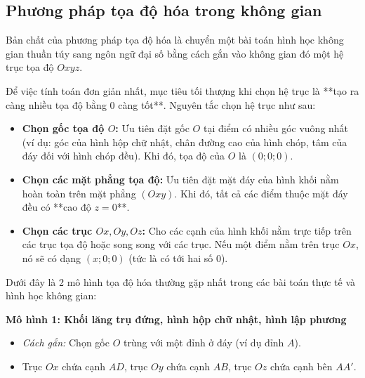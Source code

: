 \documentclass[12pt]{article}
\begin{document}
	\subsection{Phương pháp tọa độ hóa trong không gian}
	
	Bản chất của phương pháp tọa độ hóa là chuyển một bài toán hình học không gian thuần túy sang ngôn ngữ đại số bằng cách gắn vào không gian đó một hệ trục tọa độ $Oxyz$. 
	
	Để việc tính toán đơn giản nhất, mục tiêu tối thượng khi chọn hệ trục là **tạo ra càng nhiều tọa độ bằng 0 càng tốt**. Nguyên tắc chọn hệ trục như sau:
	
	\begin{itemize}
		\item \textbf{Chọn gốc tọa độ $O$:} Ưu tiên đặt gốc $O$ tại điểm có nhiều góc vuông nhất (ví dụ: góc của hình hộp chữ nhật, chân đường cao của hình chóp, tâm của đáy đối với hình chóp đều). Khi đó, tọa độ của $O$ là $(0; 0; 0)$.
		\item \textbf{Chọn các mặt phẳng tọa độ:} Ưu tiên đặt mặt đáy của hình khối nằm hoàn toàn trên mặt phẳng $(Oxy)$. Khi đó, tất cả các điểm thuộc mặt đáy đều có **cao độ $z = 0$**.
		\item \textbf{Chọn các trục $Ox, Oy, Oz$:} Cho các cạnh của hình khối nằm trực tiếp trên các trục tọa độ hoặc song song với các trục. Nếu một điểm nằm trên trục $Ox$, nó sẽ có dạng $(x; 0; 0)$ (tức là có tới hai số $0$).
	\end{itemize}
	
	Dưới đây là 2 mô hình tọa độ hóa thường gặp nhất trong các bài toán thực tế và hình học không gian:
	
	\textbf{Mô hình 1: Khối lăng trụ đứng, hình hộp chữ nhật, hình lập phương}
	\begin{itemize}
		\item \textit{Cách gắn:} Chọn gốc $O$ trùng với một đỉnh ở đáy (ví dụ đỉnh $A$).
		\item Trục $Ox$ chứa cạnh $AD$, trục $Oy$ chứa cạnh $AB$, trục $Oz$ chứa cạnh bên $AA'$.
	\end{itemize}
	
\end{document}
